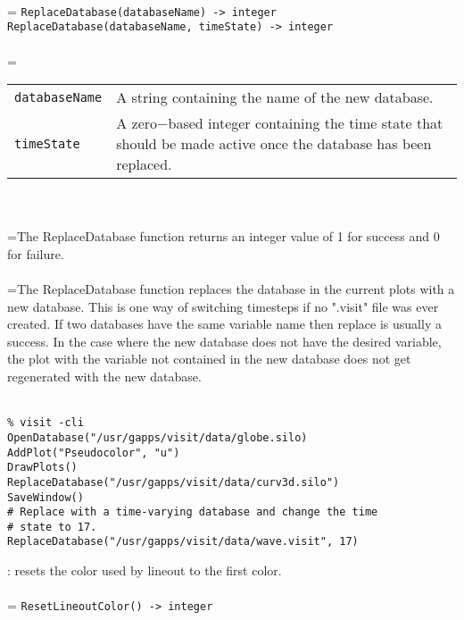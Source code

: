 \documentclass[10pt,a4paper]{report}
\begin{document}
 \\ 
\hangindent=\parindent 
\verb!ReplaceDatabase(databaseName) -> integer!\\ 
\verb!ReplaceDatabase(databaseName, timeState) -> integer!\\ [-3mm]

 \\ 
\hangindent=\parindent 
\begin{tabular}{lp{9cm}}
\verb!databaseName! & A string containing the name of the new database. \\
\verb!timeState! & A zero$-$based integer containing the time state that should be made active once the database has been replaced. \\
\end{tabular} \\[-2mm]


 \\ 
\hangindent=\parindent The ReplaceDatabase function returns an integer value of 1 for success and 0 for failure. \\[-3mm] 

 \\ 
\hangindent=\parindent The ReplaceDatabase function replaces the database in the current plots with a new database. This is one way of switching timesteps if no ".visit" file was ever created. If two databases have the same variable name then replace is usually a success. In the case where the new database does not have the desired variable, the plot with the variable not contained in the new database does not get regenerated with the new database. \\[-3mm] 

\\[-6mm]
\begin{verbatim}% visit -cli
OpenDatabase("/usr/gapps/visit/data/globe.silo)
AddPlot("Pseudocolor", "u")
DrawPlots()
ReplaceDatabase("/usr/gapps/visit/data/curv3d.silo")
SaveWindow()
# Replace with a time-varying database and change the time
# state to 17.
ReplaceDatabase("/usr/gapps/visit/data/wave.visit", 17)
\end{verbatim}
\newpage


{}
: resets the color used by lineout to the first color.\\[-3mm]

 \\ 
\hangindent=\parindent 
\verb!ResetLineoutColor() -> integer!\\ [-3mm]
\end{document}
